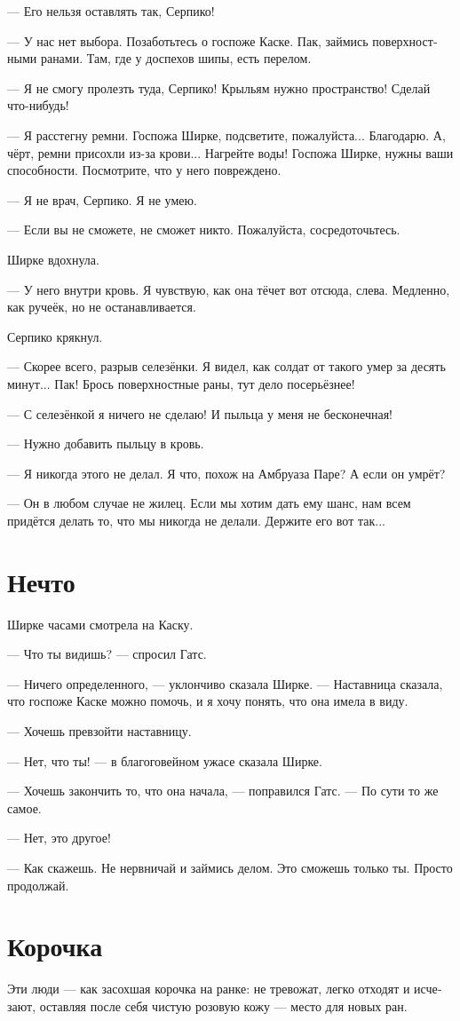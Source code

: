 \documentclass[a4paper,12pt,fleqn]{book}\usepackage{polyglossia}\setdefaultlanguage[babelshorthands=true]{russian}\setotherlanguage{english}\defaultfontfeatures{Ligatures=TeX,Mapping=tex-text}\usepackage{xcolor}\newcommand{\ml}[3]{#2}
\begin{document}
--- Его нельзя оставлять так, Серпико!

--- У нас нет выбора.
Позаботьтесь о госпоже Каске.
Пак, займись поверхностными ранами.
Там, где у доспехов шипы, есть перелом.

--- Я не смогу пролезть туда, Серпико!
Крыльям нужно пространство!
Сделай что-нибудь!

--- Я расстегну ремни.
Госпожа Ширке, подсветите, пожалуйста...
Благодарю.
А, чёрт, ремни присохли из-за крови...
Нагрейте воды!
Госпожа Ширке, нужны ваши способности.
Посмотрите, что у него повреждено.

--- Я не врач, Серпико.
Я не умею.

--- Если вы не сможете, не сможет никто.
Пожалуйста, сосредоточьтесь.

Ширке вдохнула.

--- У него внутри кровь.
Я чувствую, как она тёчет вот отсюда, слева.
Медленно, как ручеёк, но не останавливается.

Серпико крякнул.

--- Скорее всего, разрыв селезёнки.
Я видел, как солдат от такого умер за десять минут...
Пак!
Брось поверхностные раны, тут дело посерьёзнее!

--- С селезёнкой я ничего не сделаю!
И пыльца у меня не бесконечная!

--- Нужно добавить пыльцу в кровь.

--- Я никогда этого не делал.
Я что, похож на Амбруаза Паре?
А если он умрёт?

--- Он в любом случае не жилец.
Если мы хотим дать ему шанс, нам всем придётся делать то, что мы никогда не делали.
Держите его вот так...

\section{Нечто}

Ширке часами смотрела на Каску.

--- Что ты видишь? --- спросил Гатс.

--- Ничего определенного, --- уклончиво сказала Ширке.
--- Наставница сказала, что госпоже Каске можно помочь, и я хочу понять, что она имела в виду.

--- Хочешь превзойти наставницу.

--- Нет, что ты! --- в благоговейном ужасе сказала Ширке.

--- Хочешь закончить то, что она начала, --- поправился Гатс.
--- По сути то же самое.

--- Нет, это другое!

--- Как скажешь.
Не нервничай и займись делом.
Это сможешь только ты.
Просто продолжай.

\section{Корочка}

Эти люди --- как засохшая корочка на ранке: не тревожат, легко отходят и исчезают, оставляя после себя чистую розовую кожу --- место для новых ран.
\end{document}
